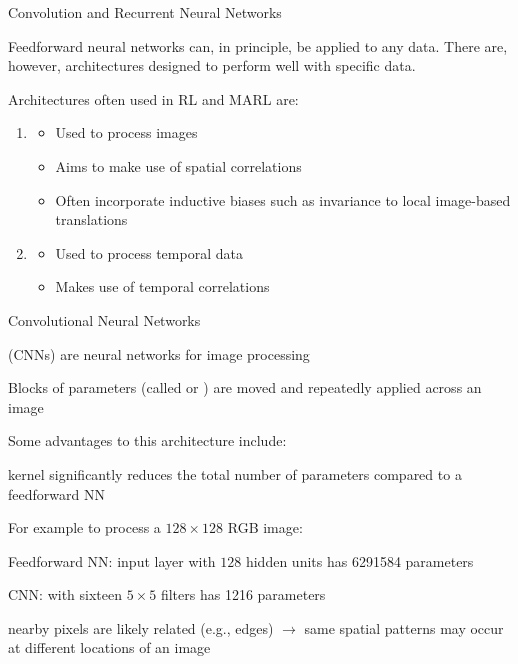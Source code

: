 \begin{frame}[t]{Convolution and Recurrent Neural Networks }

Feedforward neural networks can, in principle, be applied to any data. There are, however, architectures designed to perform well with specific data.

Architectures often used in RL and MARL are:

\begin{enumerate}
    \item {}
    \begin{itemize}
        \item Used to process images
        \item Aims to make use of spatial correlations
        \item Often incorporate inductive biases such as invariance to local image-based translations
    \end{itemize}
        \item {}
    \begin{itemize}
        \item Used to process temporal data 
        \item Makes use of temporal correlations
    \end{itemize}
\end{enumerate}
    
\end{frame}

\begin{frame}[t]{Convolutional Neural Networks}

     (CNNs) are neural networks for image processing
    \blist
        \item Blocks of parameters (called  or ) are moved and repeatedly applied across an image
    \elist

    Some advantages to this architecture include:

    \blist
        \item {} kernel significantly reduces the total number of parameters compared to a feedforward NN
        \item For example to process a $128 \times 128$ RGB image:
            \vspace{5pt}
        \blist
            \item Feedforward NN: input layer with $128$ hidden units has \num{6291584} parameters
            \item CNN: with sixteen $5\times5$ filters has \num{1216} parameters
        \elist
        \item {} nearby pixels are likely related (e.g., edges) $\rightarrow$ same spatial patterns may occur at different locations of an image
    \elist

\end{frame}


